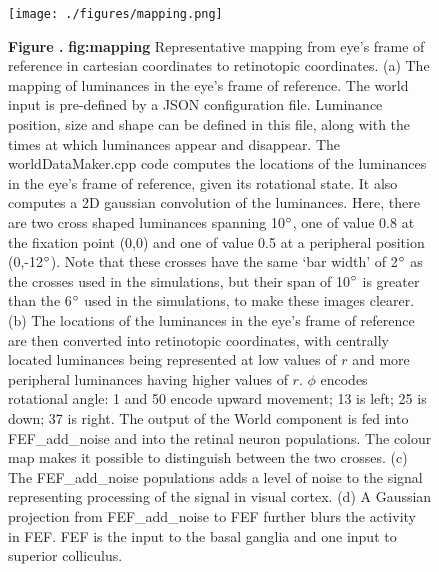 \documentclass{frontiersSCNS}
\begin{document}
\begin{figure}[htb!]
\begin{center}
\texttt{[image: ./figures/mapping.png]}
\end{center}
\textbf{\label{fig:mapping} Figure .}
{ \textbf{fig:mapping} Representative mapping from eye's frame of
reference in cartesian coordinates to retinotopic coordinates. (a) The
mapping of luminances in the eye's frame of reference. The world input
is pre-defined by a JSON configuration file. Luminance position, size
and shape can be defined in this file, along with the times at which
luminances appear and disappear. The worldDataMaker.cpp code computes
the locations of the luminances in the eye's frame of reference, given
its rotational state. It also computes a 2D gaussian convolution of
the luminances. Here, there are two cross shaped luminances spanning
10$\degree$, one of value 0.8 at the fixation point (0,0) and one of
value 0.5 at a peripheral position (0,-12$\degree$). Note that these
crosses have the same `bar width' of 2$\degree$ as the crosses 
used in the simulations, but their span of 10$\degree$ is greater
than the 6$\degree$ used in the simulations, to make these
images clearer. (b) The locations of
the luminances in the eye's frame of reference are then converted into
retinotopic coordinates, with centrally located luminances being
represented at low values of $r$ and more peripheral luminances having
higher values of $r$. $\phi$ encodes rotational angle: 1 and 50 encode
upward movement; 13 is left; 25 is down; 37 is right. The output of
the World component is fed into FEF\_add\_noise and into the retinal
neuron populations. The colour map makes it possible to distinguish
between the two crosses. (c) The FEF\_add\_noise populations adds a level
of noise to the signal representing processing of the signal in visual
cortex. (d) A Gaussian projection from FEF\_add\_noise to FEF further
blurs the activity in FEF. FEF is the input to the basal ganglia and
one input to superior colliculus.}
\end{figure}
\end{document}
